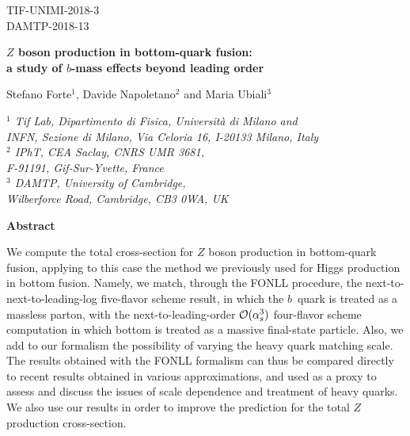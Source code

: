 \documentclass[12pt]{article}
\newcommand{\order}[1]{{\cal O}(#1)}
\begin{document}
\begin{flushright}
  TIF-UNIMI-2018-3\\
  DAMTP-2018-13
\end{flushright}

\vspace*{.2cm}

\begin{center}
  {\Large \bf{$Z$ boson production in bottom-quark fusion:\\
      a study of $b$-mass effects beyond leading order}}
\end{center}

\vspace*{.7cm}

\begin{center}
  Stefano Forte$^{1}$, Davide Napoletano$^2$ and Maria Ubiali$^{3}$
  \vspace*{.2cm}

  \noindent
      {\it
        $^1$ Tif Lab, Dipartimento di Fisica, Universit\`a di Milano and\\ 
        INFN, Sezione di Milano,
        Via Celoria 16, I-20133 Milano, Italy\\
        $^2$ IPhT, CEA Saclay, CNRS UMR 3681,\\ F-91191, Gif-Sur-Yvette, France\\
        $^3$ DAMTP, University of Cambridge,\\ Wilberforce Road, Cambridge, CB3 0WA, UK\\}

      \vspace*{3cm}

      {\bf Abstract}
\end{center}

\noindent
We compute the total cross-section for $Z$ boson production in
bottom-quark fusion, applying to this case the method we previously
used for Higgs production in bottom fusion. Namely, we  match, through
the FONLL procedure,
the  next-to-next-to-leading-log five-flavor
scheme result, in which  the $b$~quark is
treated as a massless parton, with the next-to-leading-order
$\order{\alpha_s^3}$  
four-flavor scheme computation in which bottom is treated as a massive
final-state particle.
Also, we add to our formalism the possibility of varying the
heavy quark matching scale. 
The results obtained with the FONLL formalism can thus be compared
directly
 to recent results obtained in various approximations, and used as a
proxy 
to assess and discuss the issues of scale dependence and treatment of heavy
quarks. We also use our results in order 
to improve the prediction for the total
$Z$ production cross-section.
\end{document}
